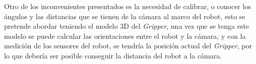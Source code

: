 Otro de los inconvenientes presentados es la necesidad de calibrar, o conocer los ángulos y las distancias que se tienen de la cámara al marco del robot, esto se pretende abordar teniendo el modelo 3D del \textit{Gripper}, una vez que se tenga este modelo se puede calcular las orientaciones entre el robot y la cámara, y con la medición de los sensores del robot, se tendría la posición actual del \textit{Gripper}, por lo que debería ser posible conseguir la distancia del robot a la cámara.






